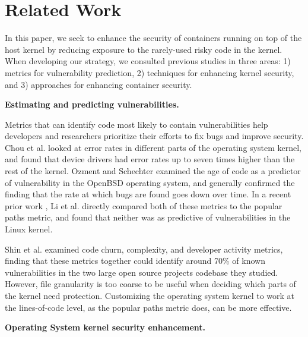 \section{Related Work}
\label{sec.related_work}
In this paper, we seek to enhance the security of containers running on top of the host kernel by reducing exposure to the rarely-used risky code in the kernel. 
When developing our strategy, we consulted previous studies in three areas: 
1) metrics for vulnerability prediction, 2) techniques for enhancing kernel security, and 3) approaches for enhancing container security. 

\textbf{Estimating and predicting vulnerabilities.} 

Metrics that can identify code most likely to contain vulnerabilities help developers and researchers prioritize their efforts to fix bugs and improve security. 
Chou et al. \cite{Chou} looked at error rates in different parts of the operating system kernel, and found that device drivers had error rates up to seven times higher than the rest of the kernel. 
Ozment and Schechter \cite{Ozment} examined the age of code as a predictor of vulnerability in the OpenBSD \cite{OpenBSD} operating system, 
and generally confirmed the finding that the rate at which bugs are found goes down over time. 
In a recent prior work \cite{Lock-in-Pop}, Li et al. directly compared both of these metrics to the  popular paths metric, and found that neither was as predictive of vulnerabilities in the Linux kernel.

Shin et al. \cite{Shin:2011:ECC} examined code churn, complexity, and developer activity metrics, 
finding that these metrics together could identify around 70\% of known vulnerabilities in the two large open source projects codebase they studied. 
However, file granularity is too coarse to be useful when deciding which parts of the kernel need protection. 
Customizing the operating system kernel to work at the lines-of-code level, as the popular paths metric \cite{Lock-in-Pop} does, can be more effective. 

\textbf{Operating System kernel security enhancement.} 

